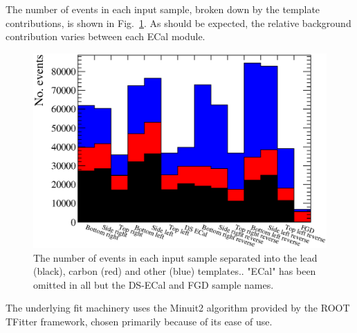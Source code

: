 The number of events in each input sample, broken down by the template contributions, is shown in Fig.~\ref{fig:NominalMCTemplates}.  As should be expected, the relative background contribution varies between each ECal module.
\begin{figure}
  \centering
  \includegraphics[width=15cm]{images/measurement/rate_fit/MC_Templates_Nominal.eps}
  \caption{The number of events in each input sample separated into the lead (black), carbon (red) and other (blue) templates..  "ECal" has been omitted in all but the DS-ECal and FGD sample names.}
  \label{fig:NominalMCTemplates}
\end{figure}
\newline
\newline
The underlying fit machinery uses the Minuit2 algorithm provided by the ROOT TFitter framework, chosen primarily because of its ease of use.


